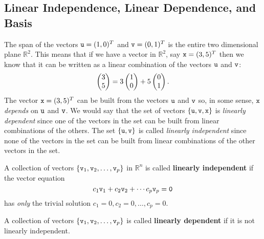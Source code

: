 \subsection{Linear Independence, Linear Dependence, and Basis}
The span of the vectors $\texttt{u} = (1,0)^T$ and $\texttt{v} = (0,1)^T$ is the entire two dimensional
plane $\mathbb{R}^2$.  This means that if we have a vector in $\mathbb{R}^2$, say $\texttt{x} =
(3,5)^T$ then we know that it can be written as a linear combination of the vectors $\texttt{u}$
and $\texttt{v}$:
\[ \begin{pmatrix} 3\\5\end{pmatrix} = 3 \begin{pmatrix} 1\\0\end{pmatrix} + 5 \begin{pmatrix} 0\\1\end{pmatrix}. \]
The vector $\texttt{x} = (3,5)^T$ can be built from the vectors $\texttt{u}$ and $\texttt{v}$ so, in some
sense, $\texttt{x}$ {\it depends} on $\texttt{u}$ and $\texttt{v}$.  We would say that the set of vectors
$\{\texttt{u},\texttt{v},\texttt{x}\}$ is {\it linearly dependent} since one of the vectors in the set can be
built from linear combinations of the others.  The set $\{\texttt{u},\texttt{v}\}$ is called {\it
linearly independent} since none of the vectors in the set can be built from linear
combinations of the other vectors in the set.
\begin{definition}
    A collection of vectors $\{\texttt{v}_1, \texttt{v}_2, \dots, \texttt{v}_p\}$ in $\mathbb{R}^n$ is called {\bf linearly
    independent} if the vector equation
    \[ c_1 \texttt{v}_1 + c_2 \texttt{v}_2 + \cdots c_p \texttt{v}_p = \texttt{0} \]
    has {\it only} the trivial solution $c_1=0, c_2=0, \dots, c_p=0$.
\end{definition}

\begin{definition}
    A collection of vectors $\{\texttt{v}_1, \texttt{v}_2, \dots, \texttt{v}_p\}$ is called {\bf linearly
    dependent} if it is not linearly independent.
\end{definition}


